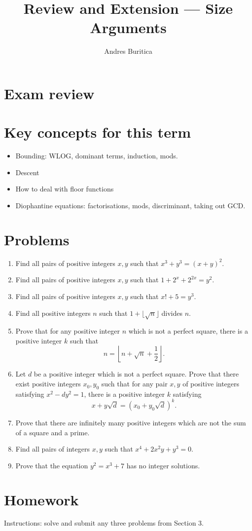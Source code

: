 \documentclass{article}
\title{Review and Extension --- Size Arguments}
\author{Andres Buritica}
\date{}
\begin{document}
\maketitle
\section{Exam review}
\newpage
\section{Key concepts for this term}
  \begin{itemize}
    \item Bounding: WLOG, dominant terms, induction, mods.
    \item Descent
    \item How to deal with floor functions
    \item Diophantine equations: factorisations, mods, discriminant, taking out
      GCD\@.
  \end{itemize}
\section{Problems}
\begin{enumerate}
  \item Find all pairs of positive integers $x,y$ such that $x^3+y^3=(x+y)^2$.
  \item Find all pairs of positive integers $x,y$ such that
    $1+2^x+2^{2x}=y^2$.
  \item Find all pairs of positive integers $x,y$ such that $x!+5=y^3$.
  \item Find all positive integers $n$ such that $1+\lfloor\sqrt n\rfloor$
    divides $n$.
  \item Prove that for any positive integer $n$ which is not a perfect square,
    there is a positive integer $k$ such that
    \[n=\left\lfloor n+\sqrt n+\frac12\right\rfloor.\]
  \item Let $d$ be a positive integer which is not a perfect square. Prove that
      there exist positive integers $x_0,y_0$ such that for any pair $x,y$ of
      positive integers satisfying $x^2-dy^2=1$, there is a positive integer $k$
      satisfying
      \[x+y\sqrt d=(x_0+y_0\sqrt d)^k.\]
  \item Prove that there are infinitely many positive integers which are not the
    sum of a square and a prime.
  \item Find all pairs of integers $x,y$ such that $x^4+2x^2y+y^3=0$.
  \item Prove that the equation $y^2=x^3+7$ has no integer solutions.
\end{enumerate}
\section{Homework}
Instructions: solve and submit any three problems from Section 3.
\end{document}
